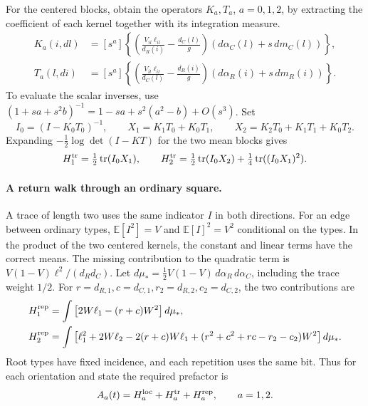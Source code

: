 For the centered blocks, obtain the operators \(K_a,T_a\), \(a=0,1,2\), by extracting the coefficient of
each kernel together with its integration measure. \begin{align*}
 K_a(i,dl)&=[s^a]\left\{\left(\frac{V_{il}\ell_{il}}{d_R(i)}-\frac{d_C(l)}g\right)
                       (d\alpha_C(l)+s\,dm_C(l))\right\},\\
 T_a(l,di)&=[s^a]\left\{\left(\frac{V_{il}\ell_{il}}{d_C(l)}-\frac{d_R(i)}g\right)
                       (d\alpha_R(i)+s\,dm_R(i))\right\}.
\end{align*} To evaluate the scalar inverses, use \((1+sa+s^2b)^{-1}=1-sa+s^2(a^2-b)+O(s^3)\). Set \[
 I_0=(I-K_0T_0)^{-1},\qquad X_1=K_1T_0+K_0T_1,\qquad
 X_2=K_2T_0+K_1T_1+K_0T_2 .
\] Expanding \(-\tfrac12\log\det(I-KT)\) for the two mean blocks gives \[
 H_1^{\rm tr}=\tfrac12\operatorname{tr}(I_0X_1),\qquad
 H_2^{\rm tr}=\tfrac12\operatorname{tr}(I_0X_2)+\tfrac14\operatorname{tr}((I_0X_1)^2).
\]

\paragraph{A return walk through an ordinary square.} A trace of length two uses the same indicator \(I\)
in both directions. For an edge between ordinary types, \(\mathbb E[I^2]=V\) and \(\mathbb E[I]^2=V^2\)
conditional on the types. In the product of the two centered kernels, the constant and linear terms have
the correct means. The missing contribution to the quadratic term is \(V(1-V)\ell^2/(d_Rd_C)\). Let
\(d\mu_*=\tfrac12
V(1-V)\,d\alpha_R\,d\alpha_C\), including the trace weight \(1/2\). For \(r=d_{R,1}, c=d_{C,1},
r_2=d_{R,2}, c_2=d_{C,2}\), the two contributions are \begin{align*}
 H_1^{\rm rep}&=\int \big[2W\ell_1-(r+c)W^2\big]\,d\mu_*,\\
 H_2^{\rm rep}&=\int \big[\ell_1^2+2W\ell_2-2(r+c)W\ell_1
              +(r^2+c^2+rc-r_2-c_2)W^2\big]\,d\mu_* .
\end{align*} Root types have fixed incidence, and each repetition uses the same bit. Thus for each
orientation and state the required prefactor is \[
 A_a(t)=H_a^{\rm loc}+H_a^{\rm tr}+H_a^{\rm rep},\qquad a=1,2 .
\]


